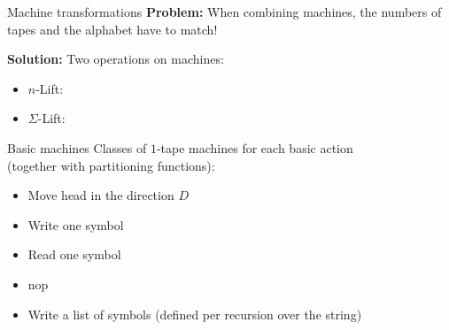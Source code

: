 \begin{frame}{Machine transformations}
  \textbf{Problem:}
  When combining machines, the numbers of tapes and the alphabet have to match!
  \pause

  \textbf{Solution:} Two operations on machines:
  \begin{itemize}
    \item $n$-Lift:
    \item $\Sigma$-Lift:
  \end{itemize}
\end{frame}

\begin{frame}{Basic machines}
  Classes of $1$-tape machines for each basic action \\(together with partitioning functions):
  \begin{itemize}
    \item Move head in the direction $D$
    \item Write one symbol
    \item Read one symbol
    \item nop
    \pause%
    \item Write a list of symbols (defined per recursion over the string)
  \end{itemize}
\end{frame}

